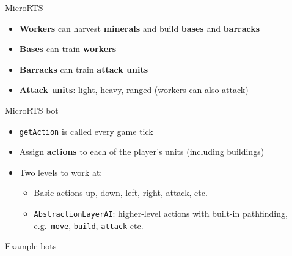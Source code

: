 \begin{frame}{MicroRTS}
    \begin{itemize}
        \pause\item \textbf{Workers} can harvest \textbf{minerals} and build \textbf{bases} and \textbf{barracks}
        \pause\item \textbf{Bases} can train \textbf{workers}
        \pause\item \textbf{Barracks} can train \textbf{attack units}
        \pause\item \textbf{Attack units}: light, heavy, ranged (workers can also attack)
    \end{itemize}
\end{frame}

\begin{frame}{MicroRTS bot}
    \begin{itemize}
        \pause\item \lstinline{getAction} is called every game tick
        \pause\item Assign \textbf{actions} to each of the player's units (including buildings)
        \pause\item Two levels to work at:
            \begin{itemize}
                \pause\item Basic actions up, down, left, right, attack, etc.
                \pause\item \lstinline{AbstractionLayerAI}: higher-level actions with built-in pathfinding, e.g.\
                    \lstinline{move}, \lstinline{build}, \lstinline{attack} etc.
            \end{itemize}
    \end{itemize}
\end{frame}

\begin{frame}{Example bots}
\end{frame}
